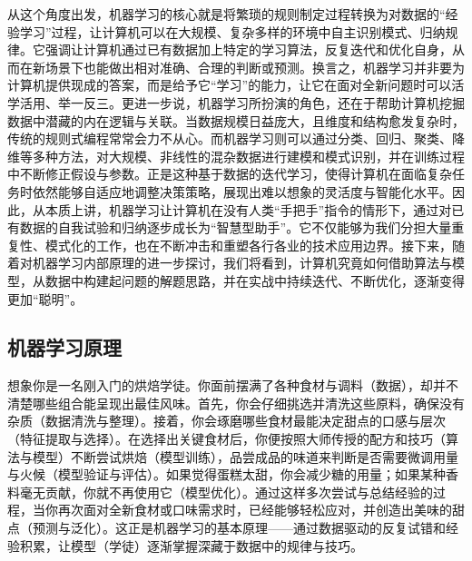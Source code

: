 从这个角度出发，机器学习的核心就是将繁琐的规则制定过程转换为对数据的“经验学习”过程，让计算机可以在大规模、复杂多样的环境中自主识别模式、归纳规律。它强调让计算机通过已有数据加上特定的学习算法，反复迭代和优化自身，从而在新场景下也能做出相对准确、合理的判断或预测。换言之，机器学习并非要为计算机提供现成的答案，而是给予它“学习”的能力，让它在面对全新问题时可以活学活用、举一反三。更进一步说，机器学习所扮演的角色，还在于帮助计算机挖掘数据中潜藏的内在逻辑与关联。当数据规模日益庞大，且维度和结构愈发复杂时，传统的规则式编程常常会力不从心。而机器学习则可以通过分类、回归、聚类、降维等多种方法，对大规模、非线性的混杂数据进行建模和模式识别，并在训练过程中不断修正假设与参数。正是这种基于数据的迭代学习，使得计算机在面临复杂任务时依然能够自适应地调整决策策略，展现出难以想象的灵活度与智能化水平。因此，从本质上讲，机器学习让计算机在没有人类“手把手”指令的情形下，通过对已有数据的自我试验和归纳逐步成长为“智慧型助手”。它不仅能够为我们分担大量重复性、模式化的工作，也在不断冲击和重塑各行各业的技术应用边界。接下来，随着对机器学习内部原理的进一步探讨，我们将看到，计算机究竟如何借助算法与模型，从数据中构建起问题的解题思路，并在实战中持续迭代、不断优化，逐渐变得更加“聪明”。

\subsection{机器学习原理}

想象你是一名刚入门的烘焙学徒。你面前摆满了各种食材与调料（数据），却并不清楚哪些组合能呈现出最佳风味。首先，你会仔细挑选并清洗这些原料，确保没有杂质（数据清洗与整理）。接着，你会琢磨哪些食材最能决定甜点的口感与层次（特征提取与选择）。在选择出关键食材后，你便按照大师传授的配方和技巧（算法与模型）不断尝试烘焙（模型训练），品尝成品的味道来判断是否需要微调用量与火候（模型验证与评估）。如果觉得蛋糕太甜，你会减少糖的用量；如果某种香料毫无贡献，你就不再使用它（模型优化）。通过这样多次尝试与总结经验的过程，当你再次面对全新食材或口味需求时，已经能够轻松应对，并创造出美味的甜点（预测与泛化）。这正是机器学习的基本原理——通过数据驱动的反复试错和经验积累，让模型（学徒）逐渐掌握深藏于数据中的规律与技巧。

